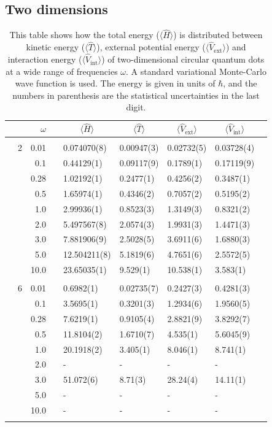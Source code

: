 \subsection{Two dimensions}
\begin{table}[h]
	\caption{This table shows how the total energy ($\langle\hat{H}\rangle$) is distributed between kinetic energy ($\langle\hat{T}\rangle$), external potential energy ($\langle\hat{V}_{\text{ext}}\rangle$) and interaction energy ($\langle\hat{V}_{\text{int}}\rangle$) of two-dimensional circular quantum dots at a wide range of frequencies $\omega$. A standard variational Monte-Carlo wave function is used. The energy is given in units of $\hbar$, and the numbers in parenthesis are the statistical uncertainties in the last digit.}
	\label{tab:splitfrequencyQDVMC}
	\begin{tabularx}{\textwidth}{R{1cm}rrcR{2.3cm}R{2.3cm}R{2.3cm}R{2.3cm}R{1cm}} \hline\hline
		&\makecell{\\ \phantom{$N$} \\ \phantom{=}} & $\omega$ &&  &  &  &  & \\ \hline \\
		&2 & 0.01 && 0.074070(8) & 0.00947(3) & 0.02732(5) & 0.03728(4) \\
		&& 0.1 && 0.44129(1) & 0.09117(9) & 0.1789(1) & 0.17119(9) \\
		&& 0.28 && 1.02192(1) & 0.2477(1) & 0.4256(2) & 0.3487(1) \\
		&& 0.5 && 1.65974(1) & 0.4346(2) & 0.7057(2) & 0.5195(2)\\
		&& 1.0 && 2.99936(1) & 0.8523(3) & 1.3149(3) & 0.8321(2)\\
		&& 2.0 && 5.497567(8) & 2.0574(3) & 1.9931(3) & 1.4471(3) \\
		&& 3.0 && 7.881906(9) & 2.5028(5) & 3.6911(6) & 1.6880(3) \\ 
		&& 5.0 && 12.504211(8) & 5.1819(6) & 4.7651(6) & 2.5572(5) \\
		&& 10.0 && 23.65035(1) & 9.529(1) & 10.538(1) & 3.583(1) \\
		\hdashline \\
		
		&6 & 0.01 && 0.6982(1) & 0.02735(7) & 0.2427(3) & 0.4281(3) \\
		&& 0.1 && 3.5695(1) & 0.3201(3) & 1.2934(6) & 1.9560(5) \\
		&& 0.28 && 7.6219(1) & 0.9105(4) & 2.8821(9) & 3.8292(7) \\
		&& 0.5 && 11.8104(2) & 1.6710(7) & 4.535(1) & 5.6045(9)\\
		&& 1.0 && 20.1918(2) & 3.405(1) & 8.046(1) & 8.741(1)\\
		&& 2.0 && - & - & - & -\\
		&& 3.0 && 51.072(6) & 8.71(3) & 28.24(4) & 14.11(1) \\ 
		&& 5.0 && - & - & - & -\\
		&& 10.0 && - & - & - & -\\
		\hdashline \\
		

\end{tabularx}
\end{table}
